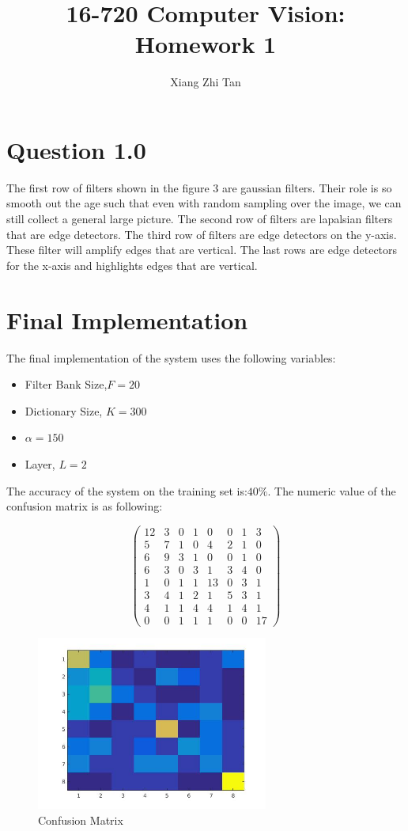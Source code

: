 \documentclass{article}
\begin{document}
\title{16-720 Computer Vision: Homework 1}
\author{Xiang Zhi Tan}

\maketitle

\section{Question 1.0}
The first row of filters shown in the figure 3 are gaussian filters. Their role is so smooth out the age such that even with random sampling over the image, we can still collect a general large picture. The second row of filters are lapalsian filters that are edge detectors. The third row of filters are edge detectors on the y-axis. These filter will amplify edges that are vertical. The last rows are edge detectors for the x-axis and highlights edges that are vertical. 

\section{Final Implementation}
The final implementation of the system uses the following variables:
\begin{itemize}
	\item Filter Bank Size,$F = 20$  
	\item Dictionary Size, $K = 300$
	\item $\alpha = 150$
	\item Layer, $L=2$
\end{itemize}
The accuracy of the system on the training set is:$40\%$.
The numeric value of the confusion matrix is as following:

\begin{equation*}
\begin{pmatrix}
    12     &3     &0     &1     &0     &0     &1     &3\\
     5     &7     &1     &0     &4     &2     &1     &0\\
     6     &9     &3     &1     &0     &0     &1     &0\\
     6     &3     &0     &3     &1     &3     &4     &0\\
     1     &0     &1     &1    &13     &0     &3     &1\\
     3     &4     &1     &2     &1     &5     &3     &1\\
     4     &1     &1     &4     &4     &1     &4     &1\\
     0     &0     &1     &1     &1    & 0     &0    &17
\end{pmatrix}
\end{equation*}

\begin{figure}
    \centering
    \includegraphics[width=3.0in]{confusion-matrix}
    \caption{Confusion Matrix}
    \label{Confusion Matrix}
\end{figure}
\end{document}
